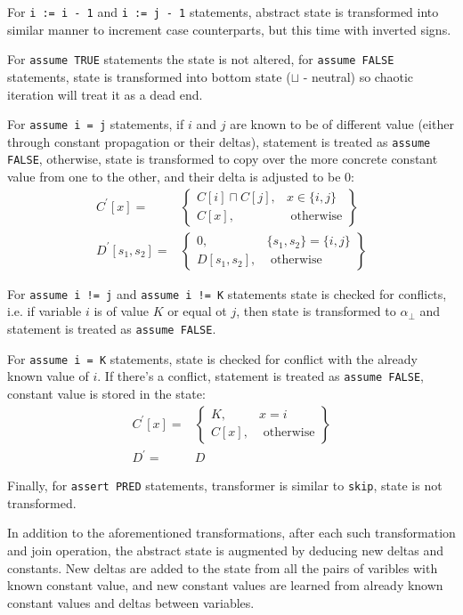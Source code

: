For \texttt{i := i - 1} and \texttt{i := j - 1} statements, abstract state is transformed into similar manner to increment case counterparts, but this time with inverted signs.

For \texttt{assume TRUE} statements the state is not altered, for \texttt{assume FALSE} statements, state is transformed into bottom state ($\sqcup$ - neutral) so chaotic iteration will treat it as a dead end.

For \texttt{assume i = j} statements, if $i$ and $j$ are known to be of different value (either through constant propagation or their deltas), statement is treated as \texttt{assume FALSE}, otherwise, state is transformed to copy over the more concrete constant value from one to the other, and their delta is adjusted to be 0:
\begin{align*}
C^\prime[x] = & \left.
	\begin{cases}
		C[i]\sqcap C[j], & x \in \{i,j\} \\
		C[x], & \text{ otherwise}
	\end{cases}
\right\}\\
D^\prime[s_1,s_2] = & \left.
\begin{cases}
	0, & \{s_1, s_2\} = \{i,j\}\\
	D[s_1,s_2], & \text{ otherwise}
\end{cases}
\right\}
\end{align*}

For \texttt{assume i != j} and \texttt{assume i != K} statements state is checked for conflicts, i.e. if variable $i$ is of value $K$ or equal ot $j$, then state is transformed to $\alpha_\bot$ and statement is treated as \texttt{assume FALSE}.

For \texttt{assume i = K} statements, state is checked for conflict with the already known value of $i$. If there's a conflict, statement is treated as \texttt{assume FALSE}, constant value is stored in the state:
\begin{align*}
C^\prime[x] = & \left.
	\begin{cases}
		K, & x = i \\
		C[x], & \text{ otherwise}
	\end{cases}
\right\}\\
D^\prime = & D
\end{align*}


Finally, for \texttt{assert PRED} statements, transformer is similar to \texttt{skip}, state is not transformed.

In addition to the aforementioned transformations, after each such transformation and join operation, the abstract state is augmented by deducing new deltas and constants. New deltas are added to the state from all the pairs of varibles with known constant value, and new constant values are learned from already known constant values and deltas between variables.
